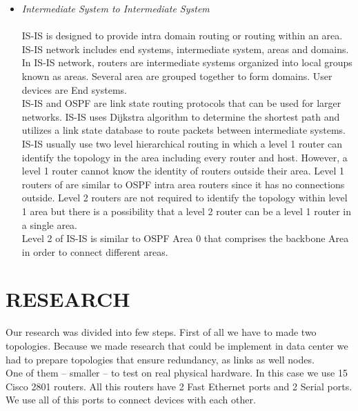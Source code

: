 \documentclass[conference,compsoc]{IEEEtran}
\begin{document}
\begin{itemize}
\item 
\emph{Intermediate System to Intermediate System}\\\\
IS-IS is designed to provide intra domain routing or routing within an area. IS-IS network includes end systems, intermediate system, areas and domains. In IS-IS network, routers are intermediate systems organized into local groups known as areas. Several area are grouped together to form domains. User devices are End systems. 
\\ IS-IS and OSPF are link state routing protocols that can be used for larger networks. IS-IS uses Dijkstra algorithm to determine the shortest path and utilizes a link state database to route packets between intermediate systems. IS-IS usually use two level hierarchical routing in which a level 1 router can identify the topology in the area including every router and host. However, a level 1 router cannot know the identity of routers outside their area. Level 1 routers of are similar to OSPF intra area routers since it has no connections outside. Level 2 routers are not required to identify the topology within level 1 area but there is a possibility that a level 2 router can be a level 1 router in a single area. 
\\ Level 2 of IS-IS is similar to OSPF Area 0 that comprises the backbone Area in order to connect different areas.
\\

\end{itemize}

\section{RESEARCH}
Our research was divided into few steps. First of all we have to made two topologies. Because we made research that could be implement in data center we had to prepare topologies that ensure redundancy, as links as well nodes. 
\\ \indent One of them – smaller – to test on real physical hardware. In this case we use 15 Cisco 2801 routers. All this routers have 2 Fast Ethernet ports and 2 Serial ports. We use all of this ports to connect devices with each other.
\end{document}
